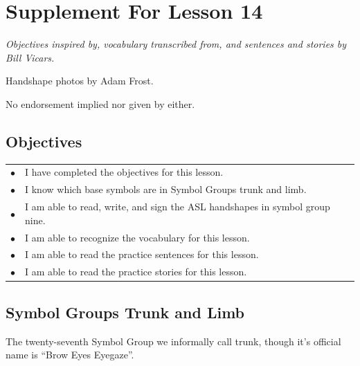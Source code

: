 \documentclass{article}
\begin{document}
\newfontfamily{}
\newfontfamily{}
\newcommand{\bul}{\hfil$\bullet$&}
\renewenvironment{glossary}{\begin{multicols}{5}\begin{center}}{\end{center}\end{multicols}}
\setcounter{secnumdepth}{0}
\setlength{\columnseprule}{1pt}

\section{Supplement For Lesson 14}

\begin{center}
\it
Objectives inspired by, vocabulary transcribed from, and sentences and stories by Bill Vicars.

Handshape photos by Adam Frost.

No endorsement implied nor given by either.
\end{center}

\subsection{Objectives}

\begin{tabular}{p{1cm}p{14cm}}
\bul I have completed the objectives for this lesson.\\
\bul I know which base symbols are in Symbol Groups trunk and limb.\\
\bul I am able to read, write, and sign the ASL handshapes in symbol group nine.\\
\bul I am able to recognize the vocabulary for this lesson.\\
\bul I am able to read the practice sentences for this lesson.\\
\bul I am able to read the practice stories for this lesson.\\
\end{tabular}

\subsection{Symbol Groups Trunk and Limb}

The twenty-seventh Symbol Group we informally call trunk, though it's official name is ``Brow Eyes Eyegaze''.
\end{document}
